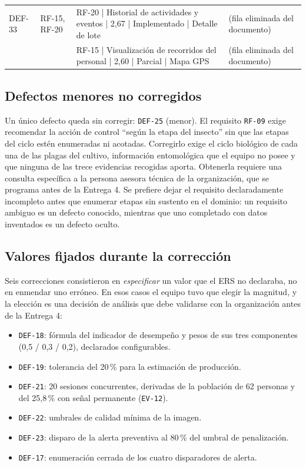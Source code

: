 \documentclass[11pt,letterpaper]{article}
\newcommand{\id}[1]{\texttt{#1}}
\begin{document}
{\begin{longtable}{p{1.35cm} p{2.1cm} p{5.4cm} p{5.4cm}}
DEF-33 & RF-15, RF-20 & RF-20 | Historial de actividades y eventos | 2,67 | Implementado | Detalle de lote & (fila eliminada del documento)\\
 &  & RF-15 | Visualización de recorridos del personal | 2,60 | Parcial | Mapa GPS & (fila eliminada del documento)\\
\end{longtable}}

\subsection*{Defectos menores no corregidos}

Un único defecto queda sin corregir: \texttt{DEF-25} (menor). El requisito \id{RF-09} exige recomendar
la acción de control ``según la etapa del insecto'' sin que las etapas del ciclo estén enumeradas ni
acotadas. Corregirlo exige el ciclo biológico de cada una de las plagas del cultivo, información
entomológica que el equipo no posee y que ninguna de las trece evidencias recogidas aporta. Obtenerla
requiere una consulta específica a la persona asesora técnica de la organización, que se programa
antes de la Entrega 4. Se prefiere dejar el requisito declaradamente incompleto antes que enumerar
etapas sin sustento en el dominio: un requisito ambiguo es un defecto conocido, mientras que uno
completado con datos inventados es un defecto oculto.

\subsection*{Valores fijados durante la corrección}

Seis correcciones consistieron en \emph{especificar} un valor que el ERS no declaraba, no en
enmendar uno erróneo. En esos casos el equipo tuvo que elegir la magnitud, y la elección es una
decisión de análisis que debe validarse con la organización antes de la Entrega 4:

\begin{itemize}[leftmargin=*, nosep]
  \item \texttt{DEF-18}: fórmula del indicador de desempeño y pesos de sus tres componentes
        (0,5 / 0,3 / 0,2), declarados configurables.
  \item \texttt{DEF-19}: tolerancia del 20\,\% para la estimación de producción.
  \item \texttt{DEF-21}: 20 sesiones concurrentes, derivadas de la población de 62 personas y del
        25,8\,\% con señal permanente (\id{EV-12}).
  \item \texttt{DEF-22}: umbrales de calidad mínima de la imagen.
  \item \texttt{DEF-23}: disparo de la alerta preventiva al 80\,\% del umbral de penalización.
  \item \texttt{DEF-17}: enumeración cerrada de los cuatro disparadores de alerta.
\end{itemize}
\end{document}
